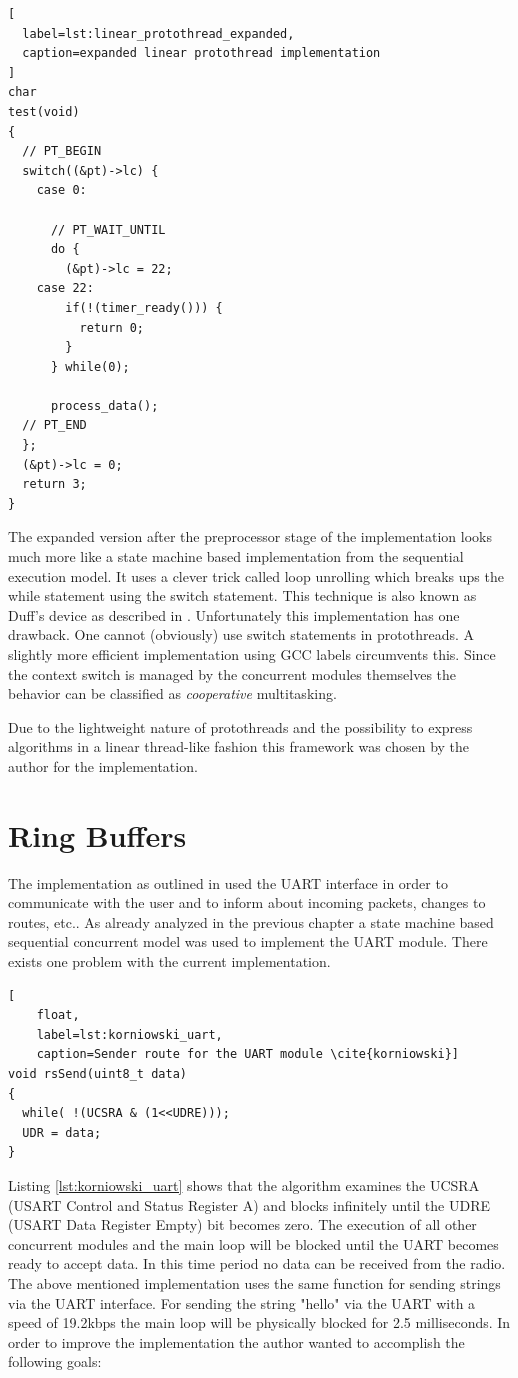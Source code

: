 \begin{lstlisting}[
  label=lst:linear_protothread_expanded,
  caption=expanded linear protothread implementation
]
char
test(void)
{
  // PT_BEGIN
  switch((&pt)->lc) {
    case 0:

      // PT_WAIT_UNTIL
      do {
        (&pt)->lc = 22;
    case 22:
        if(!(timer_ready())) {
          return 0;
        }
      } while(0);

      process_data();
  // PT_END
  };
  (&pt)->lc = 0;
  return 3;
}
\end{lstlisting}

The expanded version after the preprocessor stage of the implementation looks much more like a state machine based implementation from the sequential execution model. It uses a clever trick called loop unrolling \cite{abrash} which breaks ups the while statement using the switch statement. This technique is also known as Duff's device as described in \cite{duff}. Unfortunately this implementation has one drawback. One cannot (obviously) use switch statements in protothreads. A slightly more efficient implementation using GCC labels circumvents this. Since the context switch is managed by the concurrent modules themselves the behavior can be classified as \emph{cooperative} multitasking.

Due to the lightweight nature of protothreads and the possibility to express algorithms in a linear thread-like fashion this framework was chosen by the author for the implementation.

\section{Ring Buffers}%
The implementation as outlined in \cite{korniowski} used the UART interface in order to communicate with the user and to inform about incoming packets, changes to routes, etc.. As already analyzed in the previous chapter a state machine based sequential concurrent model was used to implement the UART module. There exists one problem with the current implementation.

\begin{lstlisting}[
	float,
	label=lst:korniowski_uart,
	caption=Sender route for the UART module \cite{korniowski}]
void rsSend(uint8_t data)
{
  while( !(UCSRA & (1<<UDRE)));
  UDR = data;
}
\end{lstlisting}

Listing \ref{lst:korniowski_uart} shows that the algorithm examines the UCSRA (USART Control and Status Register A) and blocks infinitely until the UDRE (USART Data Register Empty) bit becomes zero. The execution of all other concurrent modules and the main loop will be blocked until the UART becomes ready to accept data. In this time period no data can be received from the radio. The above mentioned implementation uses the same function for sending strings via the UART interface. For sending the string "hello" via the UART with a speed of 19.2kbps the main loop will be physically blocked for 2.5 milliseconds. In order to improve the implementation the author wanted to accomplish the following goals:

